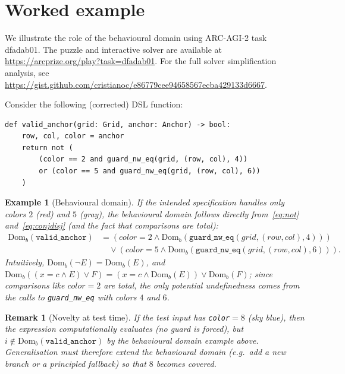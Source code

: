\documentclass[11pt]{article}
\newtheorem{remark}{Remark}
\newtheorem{example}{Example}
\newcommand{\Domb}{\mathrm{Dom}_b}
\begin{document}
\section{Worked example}

We illustrate the role of the behavioural domain using ARC-AGI-2 task dfadab01. The puzzle and interactive solver are available at \url{https://arcprize.org/play?task=dfadab01}. For the full solver simplification analysis, see \url{https://gist.github.com/cristianoc/e86779cee94658567ecba429133d6667}.

Consider the following (corrected) DSL function:
\begin{lstlisting}
def valid_anchor(grid: Grid, anchor: Anchor) -> bool:
    row, col, color = anchor
    return not (
        (color == 2 and guard_nw_eq(grid, (row, col), 4))
        or (color == 5 and guard_nw_eq(grid, (row, col), 6))
    )
\end{lstlisting}

\begin{example}[Behavioural domain]
If the intended specification handles only colors $2$ (red) and $5$ (gray), the behavioural domain follows directly from~\eqref{eq:not} and~\eqref{eq:conjdisj} (and the fact that comparisons are total):
\[
\begin{aligned}
\Domb(\texttt{valid\_anchor})
&= (color{=}2 \land \Domb(\texttt{guard\_nw\_eq}(grid,(row,col),4))) \\
&\quad \lor (color{=}5 \land \Domb(\texttt{guard\_nw\_eq}(grid,(row,col),6))).
\end{aligned}
\]
Intuitively, $\Domb(\lnot E)=\Domb(E)$, and $\Domb((x{=}c \land E)\lor F)=(x{=}c\land \Domb(E))\lor \Domb(F)$; since comparisons like $color{=}2$ are total, the only potential undefinedness comes from the calls to \texttt{guard\_nw\_eq} with colors $4$ and $6$.
\end{example}

\begin{remark}[Novelty at test time]
If the test input has \texttt{color}$=8$ (sky blue), then the expression \emph{computationally} evaluates (no guard is forced), but $i\notin\Domb(\texttt{valid\_anchor})$ by the behavioural domain example above. Generalisation must therefore extend the behavioural domain (e.g.\ add a new branch or a principled fallback) so that $8$ becomes covered.
\end{remark}
\end{document}
